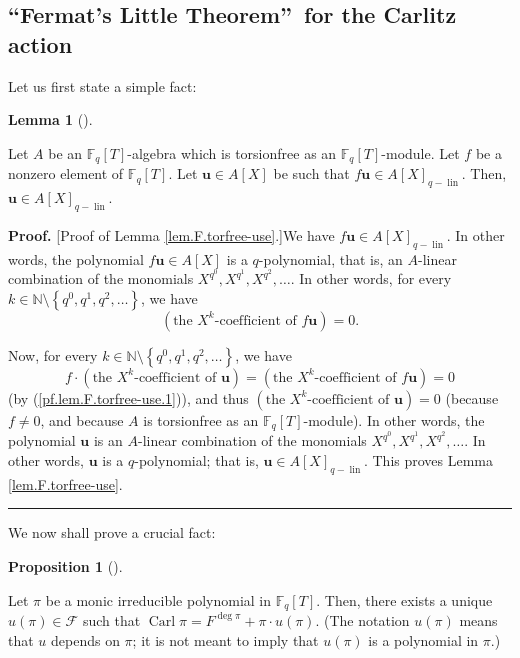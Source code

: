 \documentclass[numbers=enddot,12pt,final,onecolumn,notitlepage]{scrartcl}%
\theoremstyle{definition}
\newtheorem{lem}[theo]{Lemma}
\newenvironment{lemma}[1][]
{\begin{lem}[#1]\begin{leftbar}}
{\end{leftbar}\end{lem}}
\newtheorem{prop}[theo]{Proposition}
\newenvironment{proposition}[1][]
{\begin{prop}[#1]\begin{leftbar}}
{\end{leftbar}\end{prop}}
\newenvironment{proof}[1][Proof]{\noindent\textbf{#1.} }{\ \rule{0.5em}{0.5em}}
\begin{document}
\subsection{\textquotedblleft Fermat's Little Theorem\textquotedblright\ for
the Carlitz action}

Let us first state a simple fact:

\begin{lemma}
\label{lem.F.torfree-use}Let $A$ be an $\mathbb{F}_{q}\left[  T\right]
$-algebra which is torsionfree as an $\mathbb{F}_{q}\left[  T\right]
$-module. Let $f$ be a nonzero element of $\mathbb{F}_{q}\left[  T\right]  $.
Let $\mathbf{u}\in A\left[  X\right]  $ be such that $f\mathbf{u}\in A\left[
X\right]  _{q-\operatorname*{lin}}$. Then, $\mathbf{u}\in A\left[  X\right]
_{q-\operatorname*{lin}}$.
\end{lemma}

\begin{proof}
[Proof of Lemma \ref{lem.F.torfree-use}.]We have $f\mathbf{u}\in A\left[
X\right]  _{q-\operatorname*{lin}}$. In other words, the polynomial
$f\mathbf{u}\in A\left[  X\right]  $ is a $q$-polynomial, that is, an
$A$-linear combination of the monomials $X^{q^{0}},X^{q^{1}},X^{q^{2}},\ldots
$. In other words, for every $k\in\mathbb{N}\setminus\left\{  q^{0}%
,q^{1},q^{2},\ldots\right\}  $, we have%
\begin{equation}
\left(  \text{the }X^{k}\text{-coefficient of }f\mathbf{u}\right)  =0.
\label{pf.lem.F.torfree-use.1}%
\end{equation}


Now, for every $k\in\mathbb{N}\setminus\left\{  q^{0},q^{1},q^{2}%
,\ldots\right\}  $, we have%
\[
f\cdot\left(  \text{the }X^{k}\text{-coefficient of }\mathbf{u}\right)
=\left(  \text{the }X^{k}\text{-coefficient of }f\mathbf{u}\right)  =0
\]
(by (\ref{pf.lem.F.torfree-use.1})), and thus $\left(  \text{the }%
X^{k}\text{-coefficient of }\mathbf{u}\right)  =0$ (because $f\neq0$, and
because $A$ is torsionfree as an $\mathbb{F}_{q}\left[  T\right]  $-module).
In other words, the polynomial $\mathbf{u}$ is an $A$-linear combination of
the monomials $X^{q^{0}},X^{q^{1}},X^{q^{2}},\ldots$. In other words,
$\mathbf{u}$ is a $q$-polynomial; that is, $\mathbf{u}\in A\left[  X\right]
_{q-\operatorname*{lin}}$. This proves Lemma \ref{lem.F.torfree-use}.
\end{proof}

We now shall prove a crucial fact:

\begin{proposition}
\label{prop.F.u(pi)}Let $\pi$ be a monic irreducible polynomial in
$\mathbb{F}_{q}\left[  T\right]  $. Then, there exists a unique $u\left(
\pi\right)  \in\mathcal{F}$ such that $\operatorname*{Carl}\pi=F^{\deg\pi}%
+\pi\cdot u\left(  \pi\right)  $. (The notation $u\left(  \pi\right)  $ means
that $u$ depends on $\pi$; it is not meant to imply that $u\left(  \pi\right)
$ is a polynomial in $\pi$.)
\end{proposition}
\end{document}
